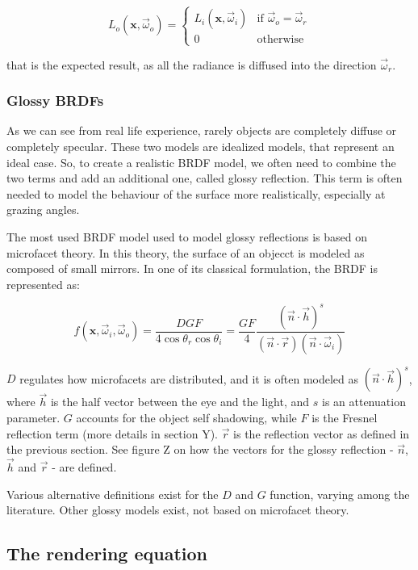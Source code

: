 \begin{equation*}
L_o(\mathbf{x}, \vec{\omega}_o) = \begin{cases}
L_i(\mathbf{x}, \vec{\omega}_i)  &\text{if $\vec{\omega}_o = \vec{\omega}_r$}\\
0 &\text{otherwise}
\end{cases}
\end{equation*}

that is the expected result, as all the radiance is diffused into the direction $\vec{\omega}_r$.

\subsubsection{Glossy BRDFs}

As we can see from real life experience, rarely objects are completely diffuse or completely specular. These two models are idealized models, that represent an ideal case. So, to create a realistic BRDF model, we often need to combine the two terms and add an additional one, called glossy reflection. This term is often needed to model the behaviour of the surface more realistically, especially at grazing angles.

The most used BRDF model used to model glossy reflections is based on microfacet theory. In this theory, the surface of an objecct is modeled as composed of small mirrors. In one of its classical formulation, the BRDF is represented as:

$$
f(\mathbf{x}, \vec{\omega}_i, \vec{\omega}_o) = \frac{D G F}{4 \cos\theta_r \cos\theta_i} = \frac{G F}{4} \frac{(\vec{n}\cdot\vec{h})^s}{(\vec{n}\cdot\vec{r})(\vec{n}\cdot\vec{\omega}_i)}
$$

$D$ regulates how microfacets are distributed, and it is often modeled as $(\vec{n}\cdot\vec{h})^s$, where $\vec{h}$ is the half vector between the eye and the light, and $s$ is an attenuation parameter. $G$ accounts for the object self shadowing, while $F$ is the Fresnel reflection term (more details in section Y).	$\vec{r}$ is the reflection vector as defined in the previous section. See figure Z on how the vectors for the glossy reflection - $\vec{n}$, $\vec{h}$ and $\vec{r}$ - are defined.

Various alternative definitions exist for the $D$ and $G$ function, varying among the literature. Other glossy models exist, not based on microfacet theory. 

\subsection{The rendering equation}

